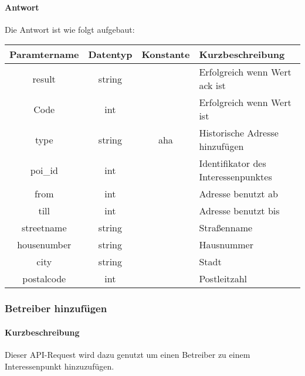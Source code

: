 \paragraph{Antwort}Die Antwort ist wie folgt aufgebaut:
\begin{table}[H]
	\begin{tabular}{|c|c|c|p{6.5cm}|}
		\hline
		\textbf{Paramtername} & \textbf{Datentyp} & \textbf{Konstante} & \textbf{Kurzbeschreibung}                                                                                               \\ \hline
		result              & string           &                 & Erfolgreich wenn Wert {\glqq ack\grqq} ist \\ \hline
		Code                & int              &                 & Erfolgreich wenn Wert {\glqq 0\grqq} ist \\ \hline
		type                & string           & aha             & Historische Adresse hinzufügen \\ \hline
		poi\_id             & int              &                 & Identifikator des Interessenpunktes \\ \hline
		from                & int              &                 & Adresse benutzt ab \\ \hline
		till                & int              &                 & Adresse benutzt bis \\ \hline
		streetname          & string           &                 & Straßenname \\ \hline
		housenumber         & string           &                 & Hausnummer \\ \hline
		city                & string           &                 & Stadt \\ \hline
		postalcode          & int              &                 & Postleitzahl \\ \hline
	\end{tabular}
\end{table}
\subsubsection{Betreiber hinzufügen}
\paragraph{Kurzbeschreibung}Dieser API-Request wird dazu genutzt um einen Betreiber zu einem Interessenpunkt hinzuzufügen.
